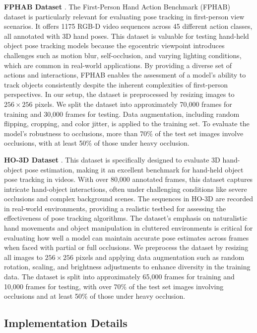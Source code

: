 \noindent \textbf{FPHAB Dataset} \cite{garcia2018first}. The First-Person Hand Action Benchmark (FPHAB) dataset is particularly relevant for evaluating pose tracking in first-person view scenarios. It offers 1175 RGB-D video sequences across 45 different action classes, all annotated with 3D hand poses. This dataset is valuable for testing hand-held object pose tracking models because the egocentric viewpoint introduces challenges such as motion blur, self-occlusion, and varying lighting conditions, which are common in real-world applications. By providing a diverse set of actions and interactions, FPHAB enables the assessment of a model's ability to track objects consistently despite the inherent complexities of first-person perspectives. In our setup, the dataset is preprocessed by resizing images to $256 \times 256$ pixels. We split the dataset into approximately 70,000 frames for training and 30,000 frames for testing. Data augmentation, including random flipping, cropping, and color jitter, is applied to the training set. To evaluate the model's robustness to occlusions, more than 70\% of the test set images involve occlusions, with at least 50\% of those under heavy occlusion.

\noindent \textbf{HO-3D Dataset} \cite{hampali2020honnotate}. This dataset is specifically designed to evaluate 3D hand-object pose estimation, making it an excellent benchmark for hand-held object pose tracking in videos. With over 80,000 annotated frames, this dataset captures intricate hand-object interactions, often under challenging conditions like severe occlusions and complex background scenes. The sequences in HO-3D are recorded in real-world environments, providing a realistic testbed for assessing the effectiveness of pose tracking algorithms. The dataset's emphasis on naturalistic hand movements and object manipulation in cluttered environments is critical for evaluating how well a model can maintain accurate pose estimates across frames when faced with partial or full occlusions. We preprocess the dataset by resizing all images to $256 \times 256$ pixels and applying data augmentation such as random rotation, scaling, and brightness adjustments to enhance diversity in the training data. The dataset is split into approximately 65,000 frames for training and 10,000 frames for testing, with over 70\% of the test set images involving occlusions and at least 50\% of those under heavy occlusion.

\subsection{Implementation Details}

